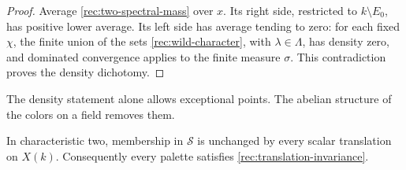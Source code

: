 \begin{proof}
Average \eqref{rec:two-spectral-mass} over \(x\).  Its right side,
restricted to \(k\setminus E_0\), has positive lower average.  Its left
side has average tending to zero: for each fixed \(\chi\), the finite
union of the sets \eqref{rec:wild-character}, with
\(\lambda\in\Lambda\), has density zero, and dominated convergence
applies to the finite measure \(\sigma\).  This contradiction proves
the density dichotomy.
\end{proof}

The density statement alone allows exceptional points.  The abelian
structure of the colors on a field removes them.

\begin{proposition}\label{rec:two}
In characteristic two, membership in \(\mathcal S\) is unchanged by
every scalar translation on \(X(k)\).  Consequently every palette
satisfies \eqref{rec:translation-invariance}.
\end{proposition}

